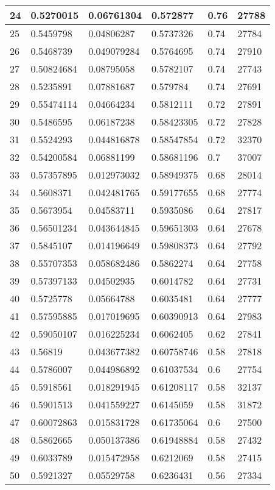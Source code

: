 \begin{longtable}{|l|l|l|l|l|l|}
24 & 0.5270015 & 0.06761304 & 0.572877 & 0.76 & 27788 \\ \hline 
25 & 0.5459798 & 0.04806287 & 0.5737326 & 0.74 & 27784 \\ \hline 
26 & 0.5468739 & 0.049079284 & 0.5764695 & 0.74 & 27910 \\ \hline 
27 & 0.50824684 & 0.08795058 & 0.5782107 & 0.74 & 27743 \\ \hline 
28 & 0.5235891 & 0.07881687 & 0.579784 & 0.74 & 27691 \\ \hline 
29 & 0.55474114 & 0.04664234 & 0.5812111 & 0.72 & 27891 \\ \hline 
30 & 0.5486595 & 0.06187238 & 0.58423305 & 0.72 & 27828 \\ \hline 
31 & 0.5524293 & 0.044816878 & 0.58547854 & 0.72 & 32370 \\ \hline 
32 & 0.54200584 & 0.06881199 & 0.58681196 & 0.7 & 37007 \\ \hline 
33 & 0.57357895 & 0.012973032 & 0.58949375 & 0.68 & 28014 \\ \hline 
34 & 0.5608371 & 0.042481765 & 0.59177655 & 0.68 & 27774 \\ \hline 
35 & 0.5673954 & 0.04583711 & 0.5935086 & 0.64 & 27817 \\ \hline 
36 & 0.56501234 & 0.043644845 & 0.59651303 & 0.64 & 27678 \\ \hline 
37 & 0.5845107 & 0.014196649 & 0.59808373 & 0.64 & 27792 \\ \hline 
38 & 0.55707353 & 0.058682486 & 0.5862274 & 0.64 & 27758 \\ \hline 
39 & 0.57397133 & 0.04502935 & 0.6014782 & 0.64 & 27731 \\ \hline 
40 & 0.5725778 & 0.05664788 & 0.6035481 & 0.64 & 27777 \\ \hline 
41 & 0.57595885 & 0.017019695 & 0.60390913 & 0.64 & 27983 \\ \hline 
42 & 0.59050107 & 0.016225234 & 0.6062405 & 0.62 & 27841 \\ \hline 
43 & 0.56819 & 0.043677382 & 0.60758746 & 0.58 & 27818 \\ \hline 
44 & 0.5786007 & 0.044986892 & 0.61037534 & 0.6 & 27754 \\ \hline 
45 & 0.5918561 & 0.018291945 & 0.61208117 & 0.58 & 32137 \\ \hline 
46 & 0.5901513 & 0.041559227 & 0.6145059 & 0.58 & 31872 \\ \hline 
47 & 0.60072863 & 0.015831728 & 0.61735064 & 0.6 & 27500 \\ \hline 
48 & 0.5862665 & 0.050137386 & 0.61948884 & 0.58 & 27432 \\ \hline 
49 & 0.6033789 & 0.015472958 & 0.6212069 & 0.58 & 27415 \\ \hline 
50 & 0.5921327 & 0.05529758 & 0.6236431 & 0.56 & 27334 \\ \hline 
\end{longtable}